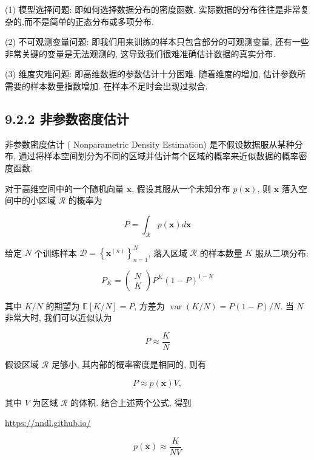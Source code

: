 \documentclass[10pt]{article}
\begin{document}
(1) 模型选择问题: 即如何选择数据分布的密度函数. 实际数据的分布往往是非常复杂的,而不是简单的正态分布或多项分布.

(2) 不可观测变量问题: 即我们用来训练的样本只包含部分的可观测变量, 还有一些非常关键的变量是无法观测的, 这导致我们很难准确估计数据的真实分布.

(3) 维度灾难问题: 即高维数据的参数估计十分困难. 随着维度的增加, 估计参数所需要的样本数量指数增加. 在样本不足时会出现过拟合.

\subsection*{9.2.2 非参数密度估计}
非参数密度估计 ( Nonparametric Density Estimation) 是不假设数据服从某种分布, 通过将样本空间划分为不同的区域并估计每个区域的概率来近似数据的概率密度函数.

对于高维空间中的一个随机向量 $\boldsymbol{x}$, 假设其服从一个未知分布 $p(\boldsymbol{x})$, 则 $\boldsymbol{x}$ 落入空间中的小区域 $\mathcal{R}$ 的概率为


\begin{equation*}
P=\int_{\mathcal{R}} p(\boldsymbol{x}) d \boldsymbol{x} \tag{9.37}
\end{equation*}


给定 $N$ 个训练样本 $\mathcal{D}=\left\{\boldsymbol{x}^{(n)}\right\}_{n=1}^{N}$, 落入区域 $\mathcal{R}$ 的样本数量 $K$ 服从二项分布:

\[
P_{K}=\left(\begin{array}{l}
N  \tag{9.38}\\
K
\end{array}\right) P^{K}(1-P)^{1-K}
\]

其中 $K / N$ 的期望为 $\mathbb{E}[K / N]=P$, 方差为 $\operatorname{var}(K / N)=P(1-P) / N$. 当 $N$ 非常大时, 我们可以近似认为


\begin{equation*}
P \approx \frac{K}{N} \tag{9.39}
\end{equation*}


假设区域 $\mathcal{R}$ 足够小, 其内部的概率密度是相同的, 则有


\begin{equation*}
P \approx p(\boldsymbol{x}) V, \tag{9.40}
\end{equation*}


其中 $V$ 为区域 $\mathcal{R}$ 的体积. 结合上述两个公式, 得到

\href{https://nndl.github.io/}{https://nndl.github.io/}


\begin{equation*}
p(\boldsymbol{x}) \approx \frac{K}{N V} \tag{9.41}
\end{equation*}
\end{document}
